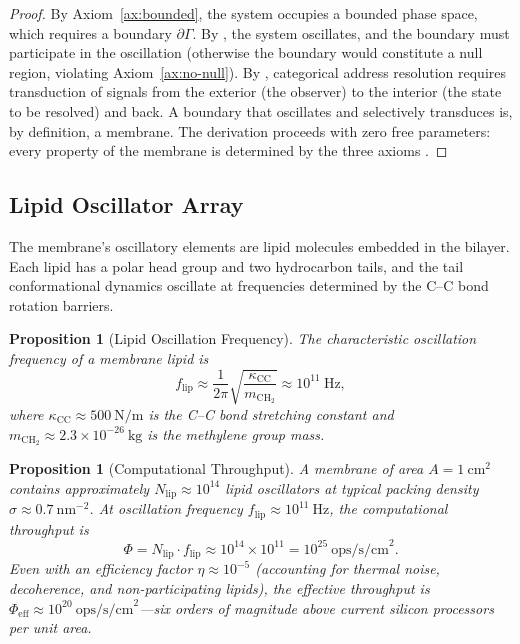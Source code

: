 \documentclass[11pt,twocolumn,a4paper]{article}
\newtheorem{proposition}[theorem]{Proposition}
\theoremstyle{definition}
\theoremstyle{remark}
\begin{document}
\begin{proof}
By Axiom~\ref{ax:bounded}, the system occupies a bounded phase space, which requires a boundary $\partial \Gamma$.  By , the system oscillates, and the boundary must participate in the oscillation (otherwise the boundary would constitute a null region, violating Axiom~\ref{ax:no-null}).  By , categorical address resolution requires transduction of signals from the exterior (the observer) to the interior (the state to be resolved) and back.  A boundary that oscillates and selectively transduces is, by definition, a membrane.  The derivation proceeds with zero free parameters: every property of the membrane is determined by the three axioms \citep{sachikonye2026membrane}.
\end{proof}

\subsection{Lipid Oscillator Array}

The membrane's oscillatory elements are lipid molecules embedded in the bilayer.  Each lipid has a polar head group and two hydrocarbon tails, and the tail conformational dynamics oscillate at frequencies determined by the C--C bond rotation barriers.

\begin{proposition}[Lipid Oscillation Frequency]\label{prop:lipid-freq}
The characteristic oscillation frequency of a membrane lipid is
\begin{equation}\label{eq:lipid-freq}
    f_{\mathrm{lip}} \approx \frac{1}{2\pi}\sqrt{\frac{\kappa_{\mathrm{CC}}}{m_{\mathrm{CH}_2}}} \approx 10^{11}~\mathrm{Hz},
\end{equation}
where $\kappa_{\mathrm{CC}} \approx 500~\mathrm{N/m}$ is the C--C bond stretching constant and $m_{\mathrm{CH}_2} \approx 2.3 \times 10^{-26}~\mathrm{kg}$ is the methylene group mass.
\end{proposition}

\begin{proposition}[Computational Throughput]\label{prop:throughput}
A membrane of area $A = 1~\mathrm{cm}^2$ contains approximately $N_{\mathrm{lip}} \approx 10^{14}$ lipid oscillators at typical packing density $\sigma \approx 0.7~\mathrm{nm}^{-2}$.  At oscillation frequency $f_{\mathrm{lip}} \approx 10^{11}~\mathrm{Hz}$, the computational throughput is
\begin{equation}\label{eq:throughput}
    \Phi = N_{\mathrm{lip}} \cdot f_{\mathrm{lip}} \approx 10^{14} \times 10^{11} = 10^{25}~\mathrm{ops/s/cm}^2.
\end{equation}
Even with an efficiency factor $\eta \approx 10^{-5}$ (accounting for thermal noise, decoherence, and non-participating lipids), the effective throughput is $\Phi_{\mathrm{eff}} \approx 10^{20}~\mathrm{ops/s/cm}^2$---six orders of magnitude above current silicon processors per unit area.
\end{proposition}
\end{document}

